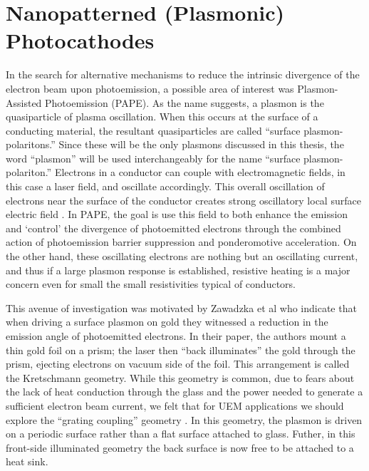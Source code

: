
\section{Nanopatterned (Plasmonic) Photocathodes}

In the search for alternative mechanisms to reduce the intrinsic divergence of the electron beam upon photoemission, a possible area of interest was Plasmon-Assisted Photoemission (PAPE). 
As the name suggests, a plasmon is the quasiparticle of plasma oscillation.
When this occurs at the surface of a conducting material, the resultant quasiparticles are called ``surface plasmon-polaritons.''
Since these will be the only plasmons discussed in this thesis, the word ``plasmon'' will be used interchangeably for the name ``surface plasmon-polariton.''
Electrons in a conductor can couple with electromagnetic fields, in this case a laser field, and oscillate accordingly.
This overall oscillation of electrons near the surface of the conductor creates strong oscillatory local surface electric field \cite{cottam_introduction_2004,concepts_2002}.
In PAPE, the goal is use this field to both enhance the emission and `control' the divergence of photoemitted electrons through the combined action of photoemission barrier suppression and ponderomotive acceleration.
On the other hand, these oscillating electrons are nothing but an oscillating current, and thus if a large plasmon response is established, resistive heating is a major concern even for small the small resistivities typical of conductors.

This avenue of investigation was motivated by Zawadzka et al \cite{zawadzka_evanescent_2001} who indicate that when driving a surface plasmon on gold they witnessed a reduction in the emission angle of photoemitted electrons.
In their paper, the authors mount a thin gold foil on a prism; the laser then ``back illuminates'' the gold through the prism, ejecting electrons on vacuum side of the foil.
This arrangement is called the Kretschmann geometry.
While this geometry is common, due to fears about the lack of heat conduction through the glass and the power needed to generate a sufficient electron beam current, we felt that for UEM applications we should explore the ``grating coupling'' geometry \cite{kupersztych_ponderomotive_2001,kupersztych_anomalous_2005,li_surface_2013}.
In this geometry, the plasmon is driven on a periodic surface rather than a flat surface attached to glass.
Futher, in this front-side illuminated geometry the back surface is now free to be attached to a heat sink.

